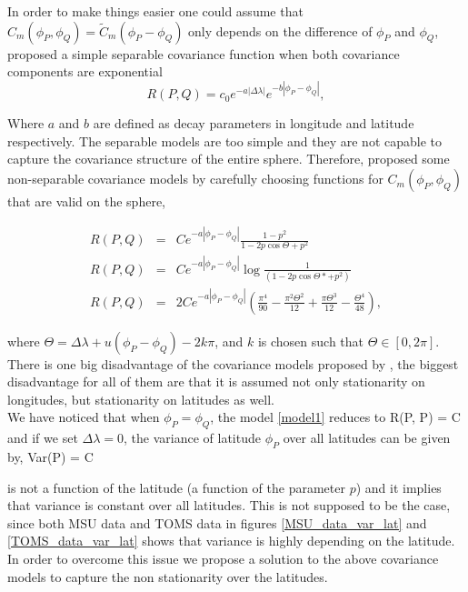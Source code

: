 	In order to make things easier one could assume that $C_m(\phi_P, \phi_Q) = \tilde{C}_m(\phi_P - \phi_Q)$ only depends on the difference of $\phi_P$ and $\phi_Q$, \cite{HuangZhangRobeson2011} proposed a simple separable covariance function when both covariance components are exponential
	\[
		R(P, Q) = c_0e^{-a|\Delta \lambda|}e^{-b|\phi_P - \phi_Q|},
	\]
		
	Where $a$ and $b$ are defined as decay parameters in longitude and latitude respectively. The separable models are too simple and they are not capable to capture the covariance structure of the entire sphere. Therefore, \cite{Huang2012} proposed some non-separable covariance models by carefully choosing functions for $C_m(\phi_P, \phi_Q)$  that are valid on the sphere,
		
	\begin{eqnarray}
		R(P,Q) &=& Ce^{-a|\phi_P-\phi_Q|} \frac{1-p^2}{1-2p \cos\Theta+p^2} \label{model1} \\
		R(P,Q) &=& Ce^{-a|\phi_P-\phi_Q|} \log\frac{1}{(1-2p\cos\Theta* + p^2)} \label{model2} \\
		R(P,Q) &=& 2Ce^{-a|\phi_P-\phi_Q|}\left(\frac{\pi^4}{90}-\frac{\pi^2\Theta^2}{12}+\frac{\pi\Theta^3}{12}-\frac{\Theta^4}{48}\right), \label{model3}
	\end{eqnarray}

where $\Theta = \Delta\lambda + u(\phi_P - \phi_Q) - 2k\pi$, and $k$ is chosen such that $\Theta \in [0,2\pi]$.\\

There is one big disadvantage of the covariance models proposed by \cite{Huang2012}, the biggest disadvantage for all of them are that it is assumed not only stationarity on longitudes, but stationarity on latitudes as well. \\

We have noticed that when $\phi_P = \phi_Q$, the model \ref{model1} reduces to
		      \beq
		      \nonumber
		      R(P, P) = C
		      \eeq
		      and if we set $\Delta \lambda = 0$, the variance of latitude $\phi_P$ over all latitudes can be given by,
		      \beq
		      \nonumber
		      Var(P) = C
		      \eeq
		      		      
		      is not a function of the latitude (a function of the parameter $p$) and it implies that variance is constant over all latitudes. This is not supposed to be the case, since both MSU data and TOMS data in figures \ref{MSU_data_var_lat} and \ref{TOMS_data_var_lat} shows that variance is highly depending on the latitude. In order to overcome this issue we propose a solution to the above covariance models to capture the non stationarity over the latitudes.		      

